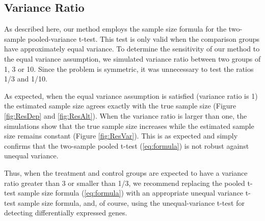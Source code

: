 \documentclass[12pt]{article}
\begin{document}
\subsection{Variance Ratio}

As described here, our method employs the sample size formula for
the two-sample pooled-variance t-test.  This test
is only valid when the comparison groups have approximately equal
variance. To determine the sensitivity of our method to the equal
variance assumption, we simulated variance ratio between two groups
of 1, 3 or 10.  Since the problem is symmetric, it was unnecessary
to test the ratios 1/3 and 1/10.

As expected, when the equal variance assumption is satisfied
(variance ratio is 1) the estimated sample size agrees exactly
with the true sample size (Figure \ref{fig:ResDep} and
\ref{fig:ResAlt}). When the variance ratio is larger than
one, the simulations show that the true sample size increases
while the estimated sample size remains constant (Figure
\ref{fig:ResVar}).   This is as expected and simply confirms that
the two-sample pooled t-test (\ref{eq:formula}) is not robust
against unequal variance.

Thus, when the treatment and control groups are expected to have a
variance ratio greater than 3 or smaller than 1/3, we recommend
replacing the pooled t-test sample size formula (\ref{eq:formula})
with an appropriate unequal variance t-test sample size formula,
and, of course, using the unequal-variance t-test for detecting
differentially expressed genes.
\end{document}
